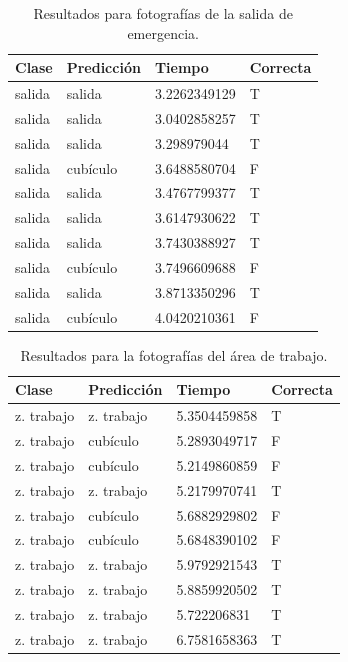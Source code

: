 \begin{table}[!h]
\centering
\begin{tabular}{|l|l|l|l|}
\hline
Clase & Predicción & Tiempo        & Correcta \\ \hline
salida  & salida       & 3.2262349129 & T     \\ \hline
salida  & salida       & 3.0402858257 & T     \\ \hline
salida  & salida     & 3.298979044  & T    \\ \hline
salida  & cubículo     & 3.6488580704 & F    \\ \hline
salida  & salida       & 3.4767799377 & T     \\ \hline
salida  & salida       & 3.6147930622 & T     \\ \hline
salida  & salida       & 3.7430388927 & T     \\ \hline
salida  & cubículo     & 3.7496609688 & F    \\ \hline
salida  & salida       & 3.8713350296 & T     \\ \hline
salida  & cubículo     & 4.0420210361 & F    \\ \hline
\end{tabular}
\caption{Resultados para fotografías de la salida de emergencia.}
\label{table:exit}
\end{table}

\begin{table}[!h]
\centering
\begin{tabular}{|l|l|l|l|}
\hline
Clase      & Predicción & Tiempo        & Correcta \\ \hline
z. trabajo & z. trabajo & 5.3504459858 & T        \\ \hline
z. trabajo & cubículo    & 5.2893049717 & F        \\ \hline
z. trabajo & cubículo    & 5.2149860859 & F        \\ \hline
z. trabajo & z. trabajo & 5.2179970741 & T        \\ \hline
z. trabajo & cubículo    & 5.6882929802 & F        \\ \hline
z. trabajo & cubículo    & 5.6848390102 & F        \\ \hline
z. trabajo & z. trabajo & 5.9792921543 & T        \\ \hline
z. trabajo & z. trabajo & 5.8859920502 & T        \\ \hline
z. trabajo & z. trabajo & 5.722206831  & T        \\ \hline
z. trabajo & z. trabajo & 6.7581658363 & T        \\ \hline
\end{tabular}
\caption{Resultados para la fotografías del área
de trabajo.}
\label{table:desks}
\end{table}

